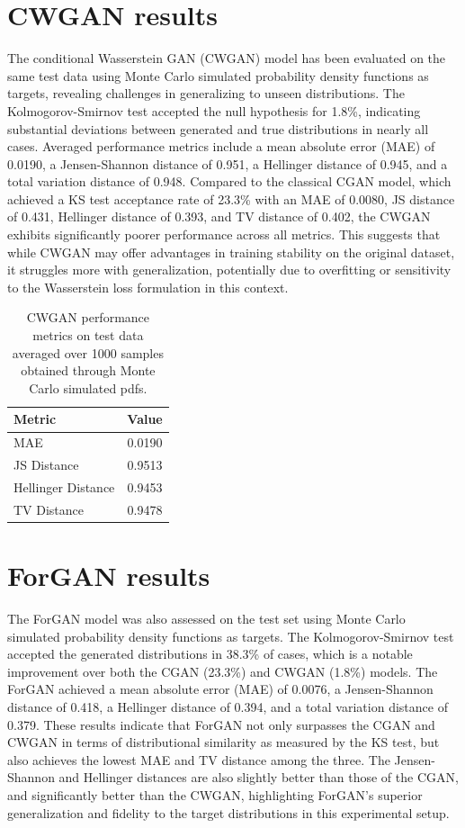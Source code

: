 \section{CWGAN results}
The conditional Wasserstein GAN (CWGAN) model has been
evaluated on the same test data using Monte Carlo simulated probability density functions as targets,
revealing challenges in generalizing to unseen distributions.
The Kolmogorov-Smirnov test accepted the null hypothesis for 1.8\%,
indicating substantial deviations between generated and true distributions in nearly all cases.
Averaged performance metrics include a mean absolute error (MAE) of 0.0190, 
a Jensen-Shannon distance of 0.951, 
a Hellinger distance of 0.945, and 
a total variation distance of 0.948. 
Compared to the classical CGAN model, 
which achieved a KS test acceptance rate of 23.3\% with an MAE of 0.0080, 
JS distance of 0.431, Hellinger distance of 0.393, 
and TV distance of 0.402, the CWGAN exhibits significantly poorer 
performance across all metrics. 
This suggests that while CWGAN may offer advantages in training stability
on the original dataset, it struggles more with generalization, potentially due to overfitting
or sensitivity to the Wasserstein loss formulation in this context.

\begin{table}[H]
\centering
\begin{tabular}{l c}
\hline
\textbf{Metric} & \textbf{Value} \\
\hline
MAE & 0.0190 \\
JS Distance & 0.9513 \\
Hellinger Distance & 0.9453 \\
TV Distance & 0.9478 \\
\hline
\end{tabular}
\caption{CWGAN performance metrics on test data averaged over 1000 samples obtained through Monte Carlo simulated pdfs.}
\end{table}


\section{ForGAN results}
The ForGAN model was also assessed on the test set 
using Monte Carlo simulated probability density functions
as targets. 
The Kolmogorov-Smirnov test accepted the generated 
distributions in 38.3\% of cases, which is a 
notable improvement over both the CGAN (23.3\%) 
and CWGAN (1.8\%) models. 
The ForGAN achieved a mean absolute error (MAE) of 0.0076,
a Jensen-Shannon distance of 0.418, a Hellinger distance 
of 0.394, and a total variation distance of 0.379. 
These results indicate that ForGAN not only surpasses 
the CGAN and CWGAN in terms of distributional similarity as 
measured by the KS test, but also achieves the lowest MAE and TV distance 
among the three. 
The Jensen-Shannon and Hellinger distances are also slightly better than those of the 
CGAN, and significantly better than the CWGAN, 
highlighting ForGAN's superior generalization 
and fidelity to the target distributions in this 
experimental setup.

